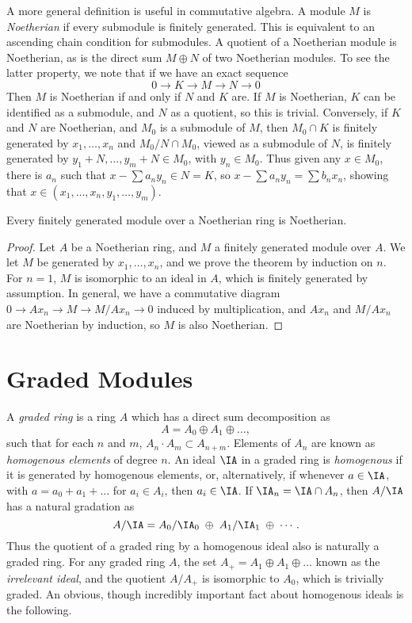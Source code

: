A more general definition is useful in commutative algebra. A module $M$ is \emph{Noetherian} if every submodule is finitely generated. This is equivalent to an ascending chain condition for submodules. A quotient of a Noetherian module is Noetherian, as is the direct sum $M \oplus N$ of two Noetherian modules. To see the latter property, we note that if we have an exact sequence
%
\[ 0 \to K \to M \to N \to 0 \]
%
Then $M$ is Noetherian if and only if $N$ and $K$ are. If $M$ is Noetherian, $K$ can be identified as a submodule, and $N$ as a quotient, so this is trivial. Conversely, if $K$ and $N$ are Noetherian, and $M_0$ is a submodule of $M$, then $M_0 \cap K$ is finitely generated by $x_1, \dots, x_n$ and $M_0/N \cap M_0$, viewed as a submodule of $N$, is finitely generated by $y_1 + N, \dots, y_m + N \in M_0$, with $y_n \in M_0$. Thus given any $x \in M_0$, there is $a_n$ such that $x - \sum a_ny_n \in N = K$, so $x - \sum a_ny_n = \sum b_nx_n$, showing that $x \in (x_1, \dots, x_n, y_1, \dots, y_m)$.

\begin{theorem}
    Every finitely generated module over a Noetherian ring is Noetherian.
\end{theorem}
\begin{proof}
    Let $A$ be a Noetherian ring, and $M$ a finitely generated module over $A$. We let $M$ be generated by $x_1, \dots, x_n$, and we prove the theorem by induction on $n$. For $n = 1$, $M$ is isomorphic to an ideal in $A$, which is finitely generated by assumption. In general, we have a commutative diagram $0 \to Ax_n \to M \to M/Ax_n \to 0$ induced by multiplication, and $Ax_n$ and $M/Ax_n$ are Noetherian by induction, so $M$ is also Noetherian.
\end{proof}

\chapter{Graded Modules}

A \emph{graded ring} is a ring $A$ which has a direct sum decomposition as
%
\[ A = A_0 \oplus A_1 \oplus \dots, \]
%
such that for each $n$ and $m$, $A_n \cdot A_m \subset A_{n + m}$. Elements of $A_n$ are known as \emph{homogenous elements} of degree $n$. An ideal $\IA$ in a graded ring is \emph{homogenous} if it is generated by homogenous elements, or, alternatively, if whenever $a \in \IA$, with $a = a_0 + a_1 + \dots$ for $a_i \in A_i$, then $a_i \in \IA$. If $\IA_n = \IA \cap A_n$, then $A/\IA$ has a natural gradation as
%
\[ A/\IA = A_0/\IA_0\; \oplus\; A_1/\IA_1\; \oplus\; \cdots. \]
%
Thus the quotient of a graded ring by a homogenous ideal also is naturally a graded ring. For any graded ring $A$, the set $A_+ = A_1 \oplus A_1 \oplus \dots$ known as the \emph{irrelevant ideal}, and the quotient $A/A_+$ is isomorphic to $A_0$, which is trivially graded. An obvious, though incredibly important fact about homogenous ideals is the following.

